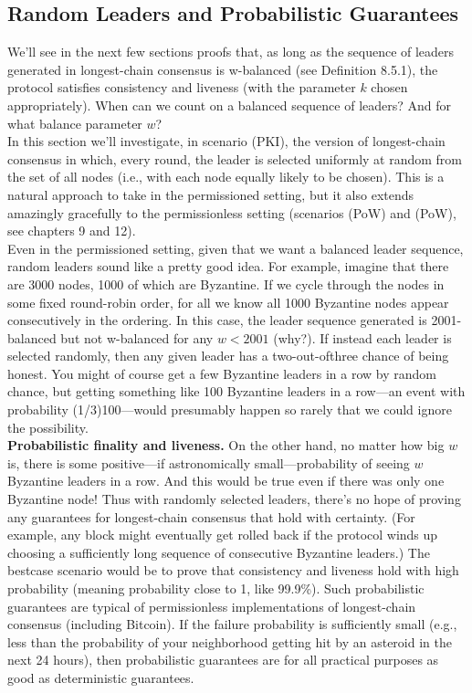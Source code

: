 \subsection{Random Leaders and Probabilistic Guarantees}
We’ll see in the next few sections proofs that, as long as the sequence of leaders generated in
longest-chain consensus is w-balanced (see Definition 8.5.1), the protocol satisfies consistency
and liveness (with the parameter $k$ chosen appropriately). When can we count on a balanced sequence of leaders? And for what balance
parameter $w$?\\
In this section we’ll investigate, in scenario (PKI), the version of longest-chain consensus
in which, every round, the leader is selected uniformly at random from the set of all nodes
(i.e., with each node equally likely to be chosen). This is a natural approach to take in the
permissioned setting, but it also extends amazingly gracefully to the permissionless setting
(scenarios (PoW) and (PoW), see chapters 9 and 12).\\
Even in the permissioned setting, given that we want a balanced leader sequence, random
leaders sound like a pretty good idea. For example, imagine that there are 3000 nodes, 1000
of which are Byzantine. If we cycle through the nodes in some fixed round-robin order,
for all we know all 1000 Byzantine nodes appear consecutively in the ordering. In this
case, the leader sequence generated is 2001-balanced but not w-balanced for any $w < 2001$
(why?). If instead each leader is selected randomly, then any given leader has a two-out-ofthree chance of being honest. You might of course get a few Byzantine leaders in a row by
random chance, but getting something like 100 Byzantine leaders in a row—an event with
probability (1/3)100—would presumably happen so rarely that we could ignore the possibility.\\

\noindent
\textbf{Probabilistic finality and liveness.} On the other hand, no matter how big $w$ is, there is
some positive—if astronomically small—probability of seeing $w$ Byzantine leaders in a row.
And this would be true even if there was only one Byzantine node! Thus with randomly
selected leaders, there’s no hope of proving any guarantees for longest-chain consensus that
hold with certainty. (For example, any block might eventually get rolled back if the protocol
winds up choosing a sufficiently long sequence of consecutive Byzantine leaders.) The bestcase scenario would be to prove that consistency and liveness hold with high probability
(meaning probability close to 1, like 99.9\%). Such probabilistic guarantees are typical of
permissionless implementations of longest-chain consensus (including Bitcoin). If the failure
probability is sufficiently small (e.g., less than the probability of your neighborhood getting
hit by an asteroid in the next 24 hours), then probabilistic guarantees are for all practical
purposes as good as deterministic guarantees.


